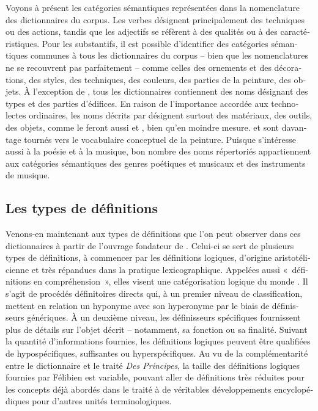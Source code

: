 \documentclass[output=paper,colorlinks,citecolor=brown,arabicfont,chinesefont,booklanguage=french]{langscibook}
\begin{document}
\begin{otherlanguage}{french}
Voyons à présent les catégories sémantiques représentées dans la nomenclature des dictionnaires du corpus. Les verbes désignent principalement des techniques ou des actions, tandis que les adjectifs se réfèrent à des qualités ou à des caractéristiques. Pour les substantifs, il est possible d’identifier des catégories sémantiques communes à tous les dictionnaires du corpus – bien que les nomenclatures ne se recouvrent pas parfaitement – comme celles des ornements et des décorations, des styles, des techniques, des couleurs, des parties de la peinture, des objets. À l’exception de \citealt{Pernety1757}, tous les dictionnaires contiennent des noms désignant des types et des parties d’édifices. En raison de l’importance accordée aux technolectes ordinaires, les noms décrits par \citet{Felibien1676} désignent surtout des matériaux, des outils, des objets, comme le feront aussi \citet{Marsy1746} et \citealt{Pernety1757}, bien qu’en moindre mesure. \citet{Lacombe1752} et \citet{Boutard1826} sont davantage tournés vers le vocabulaire conceptuel de la peinture. Puisque \citet{Lacombe1752} s’intéresse aussi à la poésie et à la musique, bon nombre des noms répertoriés appartiennent aux catégories sémantiques des genres poétiques et musicaux et des instruments de musique.

\subsection{Les types de définitions}

Venons-en maintenant aux types de définitions que l’on peut observer dans ces dictionnaires à partir de l’ouvrage fondateur de \citet{Felibien1676}. Celui-ci se sert de plusieurs types de définitions, à commencer par les définitions logiques, d’origine aristotélicienne et très répandues dans la pratique lexicographique. Appelées aussi «~définitions en compréhension~», elles visent une catégorisation logique du monde \citep{Pruvost2006}. Il s’agit de procédés définitoires directs qui, à un premier niveau de classification, mettent en relation un hyponyme avec son hyperonyme par le biais de définisseurs génériques. À un deuxième niveau, les définisseurs spécifiques fournissent plus de détails sur l’objet décrit – notamment, sa fonction ou sa finalité. Suivant la quantité d’informations fournies, les définitions logiques peuvent être qualifiées de hypospécifiques, suffisantes ou hyperspécifiques. Au vu de la complémentarité entre le dictionnaire et le traité \emph{Des Principes}, la taille des définitions logiques fournies par Félibien est variable, pouvant aller de définitions très réduites pour les concepts déjà abordés dans le traité à de véritables développements encyclopédiques pour d’autres unités terminologiques.


\end{otherlanguage}
\end{document}
